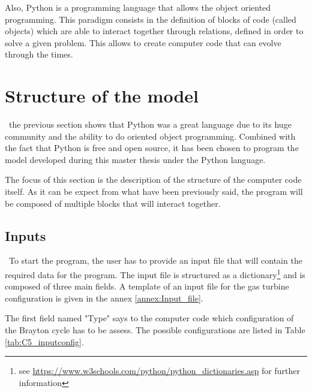 Also, Python is a programming language that allows the object oriented programming. This paradigm consists in the definition of blocks of code (called objects) which are able to interact together through relations, defined in order to solve a given problem. This allows to create computer code that can evolve through the times. 

\section{Structure of the model}
\quad\, the previous section shows that Python was a great language due to its huge community and the ability to do oriented object programming. Combined with the fact that Python is free and open source, it has been chosen to program the model developed during this master thesis under the Python language.

The focus of this section is the description of the structure of the computer code itself. As it can be expect from what have been previously said, the program will be composed of multiple blocks that will interact together.

\subsection{Inputs}
\quad\, To start the program, the user has to provide an input file that will contain the required data for the program. The input file is structured as a dictionary\footnote{see \url{https://www.w3schools.com/python/python_dictionaries.asp} for further information} and is composed of three main fields. A template of an input file for the gas turbine configuration is given in the annex \ref{annex:Input_file}.

The first field named "Type" says to the computer code which configuration of the Brayton cycle has to be assess. The possible configurations are listed in Table \ref{tab:C5_inputconfig}.

